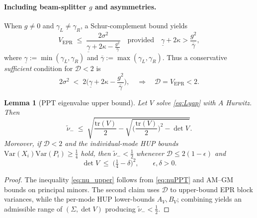 \documentclass[11pt]{article}
\newtheorem{lemma}{Lemma}
\begin{document}
\paragraph{Including beam-splitter $g$ and asymmetries.}
When $g\neq 0$ and $\gamma_L\neq \gamma_R$, a Schur-complement bound yields
\begin{equation}
V_{\mathrm{EPR}}
\;\le\;
\frac{2\sigma^2}{\underline\gamma + 2\kappa - \frac{g^2}{\overline\gamma}}
\quad\text{provided}\quad
\underline\gamma + 2\kappa > \frac{g^2}{\overline\gamma},
\label{eq:VEPR_g}
\end{equation}
where $\underline\gamma:=\min(\gamma_L,\gamma_R)$ and $\overline\gamma:=\max(\gamma_L,\gamma_R)$. Thus a conservative \emph{sufficient} condition for $\mathcal D<2$ is
\begin{equation}
2\sigma^2 \;<\; 2\Big(\underline\gamma + 2\kappa - \frac{g^2}{\overline\gamma}\Big),
\quad\Longrightarrow\quad
\mathcal D=V_{\mathrm{EPR}}<2.
\label{eq:Dbound}
\end{equation}

\begin{lemma}[PPT eigenvalue upper bound]
\label{lem:nu_bound}
Let $V$ solve \eqref{eq:Lyap} with $A$ Hurwitz. Then
\begin{equation}
\tilde\nu_- \;\le\; \sqrt{ \frac{\mathrm{tr}(V)}{2} - \sqrt{ \Big( \frac{\mathrm{tr}(V)}{2} \Big)^2 - \det V } }.
\label{eq:nu_upper}
\end{equation}
Moreover, if $\mathcal D<2$ and the individual-mode HUP bounds $\mathrm{Var}(X_i)\mathrm{Var}(P_i)\ge \tfrac14$ hold, then $\tilde\nu_-<\tfrac12$ whenever $\mathcal D \le 2(1-\epsilon)$ and
\begin{equation}
\det V \;\le\; \Big(\tfrac{1}{4}-\delta\Big)^2, \qquad \epsilon,\delta>0.
\label{eq:det_condition}
\end{equation}
\end{lemma}
\begin{proof}
The inequality \eqref{eq:nu_upper} follows from \eqref{eq:nuPPT} and AM–GM bounds on principal minors. The second claim uses $\mathcal D$ to upper-bound EPR block variances, while the per-mode HUP lower-bounds $A_V,B_V$; combining yields an admissible range of $(\Sigma,\det V)$ producing $\tilde\nu_-<\tfrac12$.
\end{proof}
\end{document}
